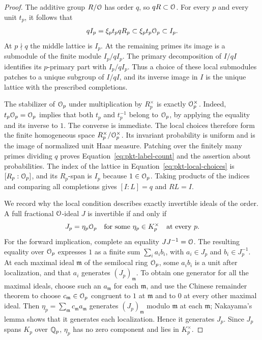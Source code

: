 \begin{proof}
The additive group \(R/\mathcal O\) has order \(q\), so \(qR\subset\mathcal O\).
For every \(p\) and every unit \(t_p\), it follows that
\[
 qI_p=\xi_p t_p qR_p\subset \xi_p t_p\mathcal O_p\subset I_p.
\]
At \(p\nmid q\) the middle lattice is \(I_p\).  At the remaining
primes its image is a submodule of the finite module \(I_p/qI_p\).
The primary decomposition of \(I/qI\) identifies its \(p\)-primary
part with \(I_p/qI_p\).  Thus a choice of these local submodules
patches to a unique subgroup of \(I/qI\), and its inverse image in
\(I\) is the unique lattice with the prescribed completions.

The stabilizer of \(\mathcal O_p\) under multiplication by \(R_p^\times\)
is exactly \(\mathcal O_p^\times\).  Indeed, \(t_p\mathcal O_p=\mathcal O_p\) implies
that both \(t_p\) and \(t_p^{-1}\) belong to \(\mathcal O_p\), by applying
the equality and its inverse to \(1\).  The converse is immediate.
The local choices therefore form the finite homogeneous space
\(R_p^\times/\mathcal O_p^\times\).  Its invariant probability is uniform
and is the image of normalized unit Haar measure.  Patching over the
finitely many primes dividing \(q\) proves
Equation~\eqref{eq:pkt-label-count} and the assertion about
probabilities.  The index of the lattice in
Equation~\eqref{eq:pkt-local-choices} is
\([R_p:\mathcal O_p]\), and its \(R_p\)-span is \(I_p\) because \(1\in\mathcal O_p\).
Taking products of the indices and comparing all completions gives
\([I:L]=q\) and \(RL=I\).

We record why the local condition describes exactly invertible ideals
of the order.  A full fractional \(\mathcal O\)-ideal \(J\) is invertible
if and only if
\begin{equation}\label{eq:pkt-local-principality}
 J_p=\eta_p\mathcal O_p\quad\text{for some }\eta_p\in K_p^\times
 \quad\text{at every }p.
\end{equation}
For the forward implication, complete an equality
\(JJ^{-1}=\mathcal O\).  The resulting equality over \(\mathcal O_p\) expresses
\(1\) as a finite sum \(\sum_i a_i b_i\), with \(a_i\in J_p\) and
\(b_i\in J_p^{-1}\).  At each maximal ideal \(\mathfrak m\) of the
semilocal ring \(\mathcal O_p\), some \(a_i b_i\) is a unit after localization,
and that \(a_i\) generates \((J_p)_{\mathfrak m}\).  To obtain one
generator for all the maximal ideals, choose such an \(a_{\mathfrak m}\)
for each \(\mathfrak m\), and use the Chinese remainder theorem
\cite[Theorem~1.14]{MilneANT} to
choose \(c_{\mathfrak m}\in\mathcal O_p\) congruent to \(1\) at
\(\mathfrak m\) and to \(0\) at every other maximal ideal.  Then
\(\eta_p=\sum_{\mathfrak m}c_{\mathfrak m}a_{\mathfrak m}\) generates
\((J_p)_{\mathfrak m}\) modulo \(\mathfrak m\) at each \(\mathfrak m\);
Nakayama's lemma \cite[Lemma~1.9]{MilneANT} shows that it generates each localization.  Hence it
generates \(J_p\).  Since \(J_p\) spans \(K_p\) over \(\mathbb Q_p\),
\(\eta_p\) has no zero component and lies in \(K_p^\times\).


\end{proof}
